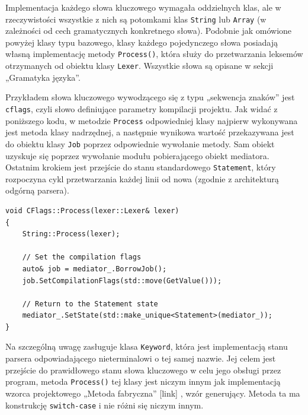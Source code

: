 Implementacja każdego słowa kluczowego wymagała oddzielnych klas, ale w rzeczywistości wszystkie z nich są potomkami klas \texttt{String} lub \texttt{Array} (w zależności od cech gramatycznych konkretnego słowa). Podobnie jak omówione powyżej klasy typu bazowego, klasy każdego pojedynczego słowa posiadają własną implementację metody \texttt{Process()}, która służy do przetwarzania leksemów otrzymanych od obiektu klasy \texttt{Lexer}. Wszystkie słowa są opisane w sekcji „Gramatyka języka”.

Przykładem słowa kluczowego wywodzącego się z typu „sekwencja znaków” jest \texttt{cflags}, czyli słowo definiujące parametry kompilacji projektu. Jak widać z poniższego kodu, w metodzie \texttt{Process} odpowiedniej klasy najpierw wykonywana jest metoda klasy nadrzędnej, a następnie wynikowa wartość przekazywana jest do obiektu klasy \texttt{Job} poprzez odpowiednie wywołanie metody. Sam obiekt uzyskuje się poprzez wywołanie modułu pobierającego obiekt mediatora. Ostatnim krokiem jest przejście do stanu standardowego \texttt{Statement}, który rozpoczyna cykl przetwarzania każdej linii od nowa (zgodnie z architekturą odgórną parsera).

\begin{lstlisting}[label=list:cflags,caption=Metoda CFlags::Process(),basicstyle=\footnotesize\ttfamily]
void CFlags::Process(lexer::Lexer& lexer)
{
    String::Process(lexer);

    // Set the compilation flags
    auto& job = mediator_.BorrowJob();
    job.SetCompilationFlags(std::move(GetValue()));

    // Return to the Statement state
    mediator_.SetState(std::make_unique<Statement>(mediator_));
}
\end{lstlisting}
    
Na szczególną uwagę zasługuje klasa \texttt{Keyword}, która jest implementacją stanu parsera odpowiadającego nieterminalowi o tej samej nazwie. Jej celem jest przejście do prawidłowego stanu słowa kluczowego w celu jego obsługi przez program, metoda \texttt{Process()} tej klasy jest niczym innym jak implementacją wzorca projektowego „Metoda fabryczna” [link] , wzór generujący. Metoda ta ma konstrukcję \texttt{switch-case} i nie różni się niczym innym.

